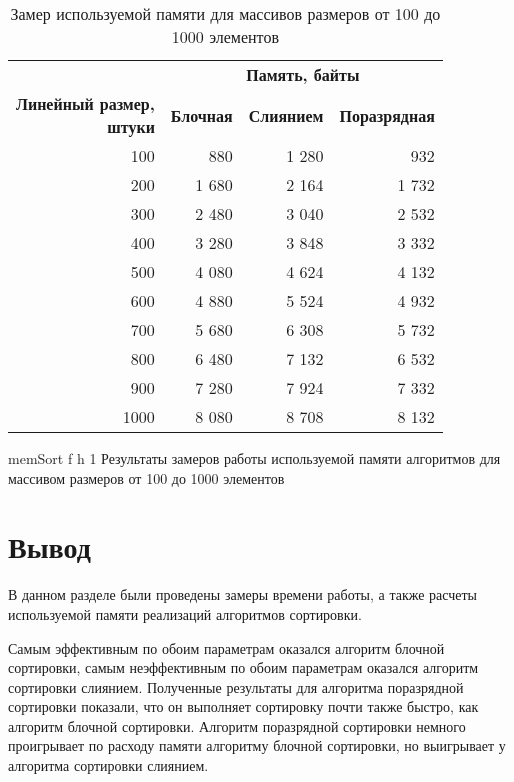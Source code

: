\begin{table}[ht]
	\small
	\begin{center}
		\begin{threeparttable}
			\caption{Замер используемой памяти для массивов размеров от 100 до 1000 элементов}
			\label{tbl:mem}
			\begin{tabular}{|r|r|r|r|}
				\hline
				& \multicolumn{3}{c|}{\bfseries Память, байты} \\ \cline{2-4}
				\bfseries \makecell{Линейный размер, \\ штуки} & \bfseries Блочная & \bfseries Слиянием & \bfseries Поразрядная \\ \cline{2-4}
				\hline
				100 & 880 & 1 280 & 932 \\
				\hline
				200 & 1 680 & 2 164 & 1 732 \\
				\hline
				300 & 2 480 & 3 040 & 2 532 \\
				\hline
				400 & 3 280 & 3 848 & 3 332 \\
				\hline
				500 & 4 080 & 4 624 & 4 132 \\
				\hline
				600 & 4 880 & 5 524 & 4 932 \\
				\hline
				700 & 5 680 & 6 308 & 5 732 \\
				\hline
				800 & 6 480 & 7 132 & 6 532 \\
				\hline
				900 & 7 280 & 7 924 & 7 332 \\
				\hline
				1000 & 8 080 & 8 708 & 8 132 \\
				\hline
			\end{tabular}	
		\end{threeparttable}
	\end{center}
\end{table}

\clearpage

{memSort} %
{f} %
{h} %
{1\textwidth} %
{Результаты замеров работы используемой памяти алгоритмов для массивом размеров от 100 до 1000 элементов} %

\section*{Вывод}

В данном разделе были проведены замеры времени работы, а также расчеты используемой памяти реализаций алгоритмов сортировки. 

Самым эффективным по обоим параметрам оказался алгоритм блочной сортировки, самым неэффективным по обоим параметрам оказался алгоритм сортировки слиянием. Полученные результаты для алгоритма поразрядной сортировки показали, что он выполняет сортировку почти также быстро, как алгоритм блочной сортировки. Алгоритм поразрядной сортировки немного проигрывает по расходу памяти алгоритму блочной сортировки, но выигрывает у алгоритма сортировки слиянием.

